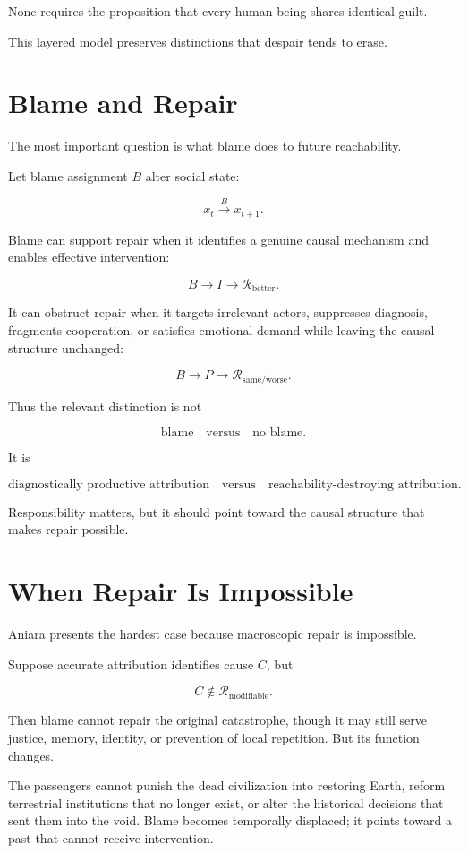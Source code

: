 \documentclass[11pt,oneside]{book}
\theoremstyle{definition}
\theoremstyle{remark}
\newcommand{\R}{\mathcal{R}}
\begin{document}
None requires the proposition that every human being shares identical guilt.

This layered model preserves distinctions that despair tends to erase.

\section{Blame and Repair}

The most important question is what blame does to future reachability.

Let blame assignment \(B\) alter social state:

\[
x_t\xrightarrow{B}x_{t+1}.
\]

Blame can support repair when it identifies a genuine causal mechanism and enables effective intervention:

\[
B
\rightarrow
I
\rightarrow
\R_{\mathrm{better}}.
\]

It can obstruct repair when it targets irrelevant actors, suppresses diagnosis, fragments cooperation, or satisfies emotional demand while leaving the causal structure unchanged:

\[
B
\rightarrow
P
\rightarrow
\R_{\mathrm{same/worse}}.
\]

Thus the relevant distinction is not

\[
\text{blame}
\quad\text{versus}\quad
\text{no blame}.
\]

It is

\[
\text{diagnostically productive attribution}
\quad\text{versus}\quad
\text{reachability-destroying attribution}.
\]

Responsibility matters, but it should point toward the causal structure that makes repair possible.

\section{When Repair Is Impossible}

Aniara presents the hardest case because macroscopic repair is impossible.

Suppose accurate attribution identifies cause \(C\), but

\[
C\notin\R_{\mathrm{modifiable}}.
\]

Then blame cannot repair the original catastrophe, though it may still serve justice, memory, identity, or prevention of local repetition. But its function changes.

The passengers cannot punish the dead civilization into restoring Earth, reform terrestrial institutions that no longer exist, or alter the historical decisions that sent them into the void. Blame becomes temporally displaced; it points toward a past that cannot receive intervention.
\end{document}
